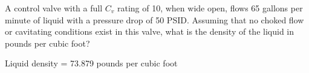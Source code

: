 

A control valve with a full $C_v$ rating of 10, when wide open, flows 65 gallons per minute of liquid with a pressure drop of 50 PSID.  Assuming that no choked flow or cavitating conditions exist in this valve, what is the density of the liquid in pounds per cubic foot?







Liquid density = 73.879 pounds per cubic foot
 









